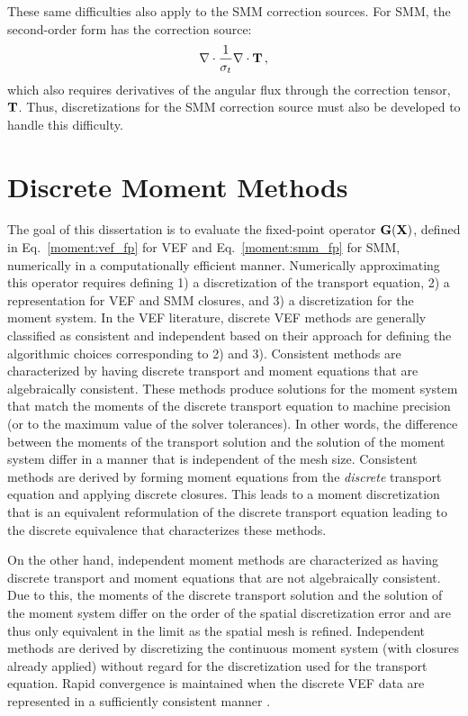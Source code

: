 \documentclass[../doc.tex]{subfiles}
\begin{document}
These same difficulties also apply to the SMM correction sources. For SMM, the second-order form has the correction source: 
	\begin{equation}
		\nabla\cdot\frac{1}{\sigma_t}\nabla\cdot\boldsymbol{\mathrm{T}} \,, 
	\end{equation}
which also requires derivatives of the angular flux through the correction tensor, $\boldsymbol{\mathrm{T}}$. Thus, discretizations for the SMM correction source must also be developed to handle this difficulty.

\section{Discrete Moment Methods}
The goal of this dissertation is to evaluate the fixed-point operator $\boldsymbol{\mathrm{G}}(\boldsymbol{\mathrm{X}})$, defined in Eq.~\ref{moment:vef_fp} for VEF and Eq.~\ref{moment:smm_fp} for SMM, numerically in a computationally efficient manner. Numerically approximating this operator requires defining 1) a discretization of the transport equation, 2) a representation for VEF and SMM closures, and 3) a discretization for the moment system. In the VEF literature, discrete VEF methods are generally classified as consistent and independent based on their approach for defining the algorithmic choices corresponding to 2) and 3). Consistent methods are characterized by having discrete transport and moment equations that are algebraically consistent. These methods produce solutions for the moment system that match the moments of the discrete transport equation to machine precision (or to the maximum value of the solver tolerances). In other words, the difference between the moments of the transport solution and the solution of the moment system differ in a manner that is independent of the mesh size. Consistent methods are derived by forming moment equations from the \emph{discrete} transport equation and applying discrete closures. This leads to a moment discretization that is an equivalent reformulation of the discrete transport equation leading to the discrete equivalence that characterizes these methods. 

On the other hand, independent moment methods are characterized as having discrete transport and moment equations that are not algebraically consistent. Due to this, the moments of the discrete transport solution and the solution of the moment system differ on the order of the spatial discretization error and are thus only equivalent in the limit as the spatial mesh is refined. 
Independent methods are derived by discretizing the continuous moment system (with closures already applied) without regard for the discretization used for the transport equation. Rapid convergence is maintained when the discrete VEF data are represented in a sufficiently consistent manner \cite{two-level-independent-warsa}. 
\end{document}
